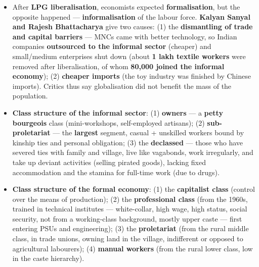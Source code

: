 \begin{KeyConcept}
\begin{itemize}
\item After \textbf{LPG liberalisation}, economists expected \textbf{formalisation}, but the opposite happened --- \textbf{informalisation} of the labour force. \textbf{Kalyan Sanyal and Rajesh Bhattacharya} give two causes: (1) the \textbf{dismantling of trade and capital barriers} --- MNCs came with better technology, so Indian companies \textbf{outsourced to the informal sector} (cheaper) and small/medium enterprises shut down (about \textbf{1 lakh textile workers} were removed after liberalisation, of whom \textbf{80,000 joined the informal economy}); (2) \textbf{cheaper imports} (the toy industry was finished by Chinese imports). Critics thus say globalisation did not benefit the mass of the population.
\item \textbf{Class structure of the informal sector}: (1) \textbf{owners} --- a \textbf{petty bourgeois} class (mini-workshops, self-employed artisans); (2) \textbf{sub-proletariat} --- the \textbf{largest} segment, casual + unskilled workers bound by kinship ties and personal obligation; (3) the \textbf{declassed} --- those who have severed ties with family and village, live like vagabonds, work irregularly, and take up deviant activities (selling pirated goods), lacking fixed accommodation and the stamina for full-time work (due to drugs).
\item \textbf{Class structure of the formal economy}: (1) the \textbf{capitalist class} (control over the means of production); (2) the \textbf{professional class} (from the 1960s, trained in technical institutes --- white-collar, high wage, high status, social security, not from a working-class background, mostly upper caste --- first entering PSUs and engineering); (3) the \textbf{proletariat} (from the rural middle class, in trade unions, owning land in the village, indifferent or opposed to agricultural labourers); (4) \textbf{manual workers} (from the rural lower class, low in the caste hierarchy).
\end{itemize}
\end{KeyConcept}

